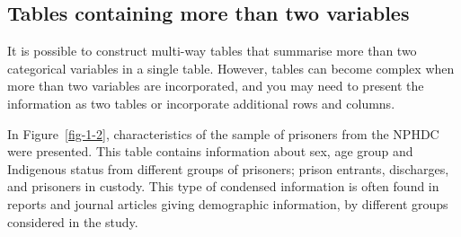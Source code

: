 \documentclass[
  a4paper,
]{memoir}
\newcounter{none} %
\begin{document}
\begin{table}[h]

\caption{\label{tbl-1-sex-stage-row}Frequency of participants by sex and
stage of disease*, including row percents}


\end{table}%

\newpage

\subsection{Tables containing more than two
variables}\label{tables-containing-more-than-two-variables}

It is possible to construct multi-way tables that summarise more than
two categorical variables in a single table. However, tables can become
complex when more than two variables are incorporated, and you may need
to present the information as two tables or incorporate additional rows
and columns.

In Figure~\ref{fig-1-2}, characteristics of the sample of prisoners from
the NPHDC were presented. This table contains information about sex, age
group and Indigenous status from different groups of prisoners; prison
entrants, discharges, and prisoners in custody. This type of condensed
information is often found in reports and journal articles giving
demographic information, by different groups considered in the study.
\end{document}
